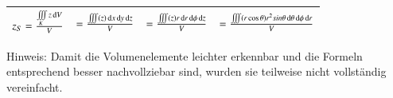 {\begin{tabular}{|l|l|l|l|}
        \bigstrut[tb]$ z_{S} = \frac{\iiint\limits_{K} z \mathop{} \! \mathrm{d} V}{V} $ & 
        $ = \frac{\iiint (z) \mathop{} \! \mathrm{d} x \mathop{} \! \mathrm{d} y \mathop{} \! \mathrm{d} z}{V} $ &
        $ = \frac{\iiint (z) r \mathop{} \! \mathrm{d} r \mathop{} \! \mathrm{d} \phi \mathop{} \! \mathrm{d} z}{V} $ &
        $ = \frac{\iiint (r \cos \theta) r^2 sin \theta \mathop{} \! \mathrm{d} \theta \mathop{} \! \mathrm{d} \phi \mathop{} \! \mathrm{d} r}{V} $ \\
        \hline
    \end{tabular}
}

\smallskip
Hinweis: Damit die Volumenelemente leichter erkennbar und die Formeln entsprechend besser nachvollziebar sind, wurden sie teilweise nicht vollständig vereinfacht.





        
